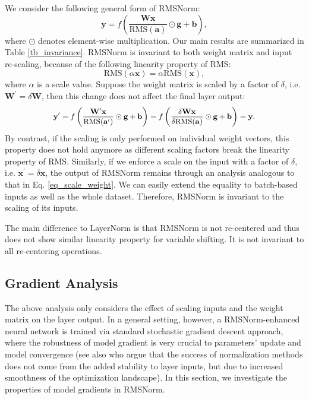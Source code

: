 \documentclass{article}
\begin{document}
We consider the following general form of RMSNorm:
\begin{equation}
    \mathbf{y} = f\left(\frac{\mathbf{Wx}}{\text{RMS}(\mathbf{a})} \odot \mathbf{g} + \mathbf{b}\right),
\end{equation}
where $\odot$ denotes element-wise multiplication. Our main results are summarized in Table \ref{tb_invariance}. RMSNorm is invariant to both weight matrix and input re-scaling, because of the following linearity property of RMS:
\begin{equation}\label{eq_linear_rms}
    \text{RMS}(\alpha\mathbf{x}) = \alpha \text{RMS}(\mathbf{x}), 
\end{equation}
where $\alpha$ is a scale value.
Suppose the weight matrix is scaled by a factor of $\delta$, i.e. $\mathbf{W}^\prime = \delta\mathbf{W}$, then this change does not affect the final layer output:
\begin{equation}\label{eq_scale_weight}
    \small
    \begin{split}
        \mathbf{y}^\prime = f\left(\frac{\mathbf{W^{\prime}x}}{\text{RMS}(\mathbf{a}^\prime)} \odot \mathbf{g} + \mathbf{b}\right) = f\left(\frac{\delta\mathbf{Wx}}{\delta\text{RMS}(\mathbf{a})} \odot \mathbf{g} + \mathbf{b}\right) = \mathbf{y}.
    \end{split}
\end{equation}
By contrast, if the scaling is only performed on individual weight vectors, this property does not hold anymore as different scaling factors break the linearity property of RMS.
Similarly, if we enforce a scale on the input with a factor of $\delta$, i.e. $\mathbf{x}^\prime = \delta \mathbf{x}$, the output of RMSNorm remains through an analysis analogous to that in Eq. \ref{eq_scale_weight}. We can easily extend the equality to batch-based inputs as well as the whole dataset. Therefore, RMSNorm is invariant to the scaling of its inputs.

The main difference to LayerNorm is that RMSNorm is not re-centered and thus does not show similar linearity property for variable shifting. It is not invariant to all re-centering operations.

\subsection{Gradient Analysis}

The above analysis only considers the effect of scaling inputs and the weight matrix on the layer output. In a general setting, however, a RMSNorm-enhanced neural network is trained via standard stochastic gradient descent approach, where the robustness of model gradient is very crucial to parameters' update and model convergence (see also \citet{santurkar2018does} who argue that the success of normalization methods does not come from the added stability to layer inputs, but due to increased smoothness of the optimization landscape). In this section, we investigate the properties of model gradients in RMSNorm.
\end{document}
